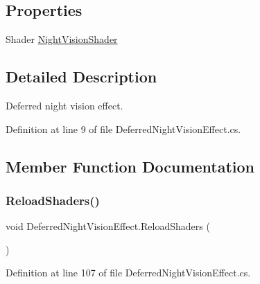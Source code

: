 \subsection*{Properties}
\begin{DoxyCompactItemize}
\item 
Shader \mbox{\hyperlink{class_deferred_night_vision_effect_af76ac232ab142cdc4552a8259fb57120}{Night\+Vision\+Shader}}
\end{DoxyCompactItemize}


\subsection{Detailed Description}
Deferred night vision effect. 



Definition at line 9 of file Deferred\+Night\+Vision\+Effect.\+cs.



\subsection{Member Function Documentation}
\mbox{\label{class_deferred_night_vision_effect_ad89297ec17aafe350994cd2e50c60d04}} 
\subsubsection{\texorpdfstring{Reload\+Shaders()}{ReloadShaders()}}
{\footnotesize\ttfamily void Deferred\+Night\+Vision\+Effect.\+Reload\+Shaders (\begin{DoxyParamCaption}{ }\end{DoxyParamCaption})}



Definition at line 107 of file Deferred\+Night\+Vision\+Effect.\+cs.

\mbox{\label{class_deferred_night_vision_effect_a9b901a59c7f42e8c06eb1a146feb3630}} 
